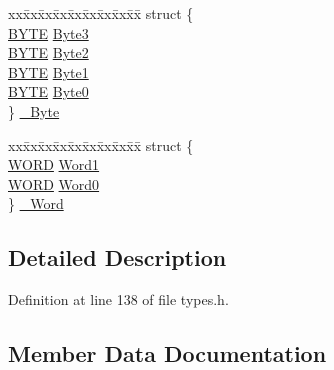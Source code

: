 \begin{DoxyCompactItemize}
\begin{tabbing}
\end{tabbing}\item 
\begin{tabbing}
xx\=xx\=xx\=xx\=xx\=xx\=xx\=xx\=xx\=\kill
struct \{\\
\>\hyperlink{types_8h_ae044ebb2609ed229a46e78b90779d73d}{BYTE} \hyperlink{union___d_w_o_r_d_a4d8de410bf31d0c6b8b10d2a8061c1d1}{Byte3}\\
\>\hyperlink{types_8h_ae044ebb2609ed229a46e78b90779d73d}{BYTE} \hyperlink{union___d_w_o_r_d_abc386cf90e4596d6ce5f50d808ff5ae3}{Byte2}\\
\>\hyperlink{types_8h_ae044ebb2609ed229a46e78b90779d73d}{BYTE} \hyperlink{union___d_w_o_r_d_ad023bbdcb677a0d6ca5877abe3940cdb}{Byte1}\\
\>\hyperlink{types_8h_ae044ebb2609ed229a46e78b90779d73d}{BYTE} \hyperlink{union___d_w_o_r_d_ae3e29036d675c90ac9d965ae258878d6}{Byte0}\\
\} \hyperlink{union___d_w_o_r_d_ad176fa8b9b8c6e1e40bd3bad4f59d3ab}{\_Byte}\\

\end{tabbing}\item 
\begin{tabbing}
xx\=xx\=xx\=xx\=xx\=xx\=xx\=xx\=xx\=\kill
struct \{\\
\>\hyperlink{types_8h_a97d510db52424c21aa68ebf2023b2631}{WORD} \hyperlink{union___d_w_o_r_d_ad8b2ec64b0d9bb77f2441fc54372d4cd}{Word1}\\
\>\hyperlink{types_8h_a97d510db52424c21aa68ebf2023b2631}{WORD} \hyperlink{union___d_w_o_r_d_a94323b21e836ab756084129752329a4e}{Word0}\\
\} \hyperlink{union___d_w_o_r_d_a67ca444bc61758c9f2d2b99711cb46d3}{\_Word}\\

\end{tabbing}\end{DoxyCompactItemize}


\subsection{Detailed Description}


Definition at line 138 of file types.\+h.



\subsection{Member Data Documentation}
